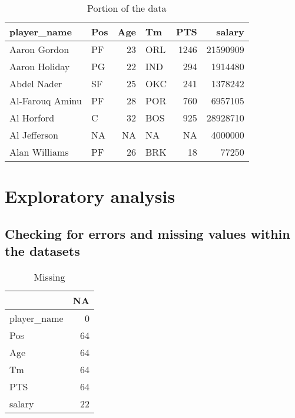 \documentclass[
]{article}
\begin{document}
\begin{table}[!h]

\caption{\label{tab:unnamed-chunk-1}Portion of the data}
\centering
\begin{tabular}[t]{l|l|r|l|r|r}
\hline
player\_name & Pos & Age & Tm & PTS & salary\\
\hline
Aaron Gordon & PF & 23 & ORL & 1246 & 21590909\\
\hline
Aaron Holiday & PG & 22 & IND & 294 & 1914480\\
\hline
Abdel Nader & SF & 25 & OKC & 241 & 1378242\\
\hline
Al-Farouq Aminu & PF & 28 & POR & 760 & 6957105\\
\hline
Al Horford & C & 32 & BOS & 925 & 28928710\\
\hline
Al Jefferson & NA & NA & NA & NA & 4000000\\
\hline
Alan Williams & PF & 26 & BRK & 18 & 77250\\
\hline
\end{tabular}
\end{table}

\hypertarget{exploratory-analysis}{%
\section{Exploratory analysis}\label{exploratory-analysis}}

\hypertarget{checking-for-errors-and-missing-values-within-the-datasets}{%
\subsection{Checking for errors and missing values within the
datasets}\label{checking-for-errors-and-missing-values-within-the-datasets}}

\begin{table}[!h]

\caption{\label{tab:unnamed-chunk-2}Missing}
\centering
\begin{tabular}[t]{l|r}
\hline
  & NA\\
\hline
player\_name & 0\\
\hline
Pos & 64\\
\hline
Age & 64\\
\hline
Tm & 64\\
\hline
PTS & 64\\
\hline
salary & 22\\
\hline
\end{tabular}
\end{table}
\end{document}
